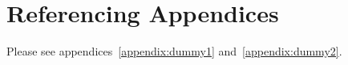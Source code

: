 \section{Referencing Appendices}

Please see appendices~\ref{appendix:dummy1} and~\ref{appendix:dummy2}.
